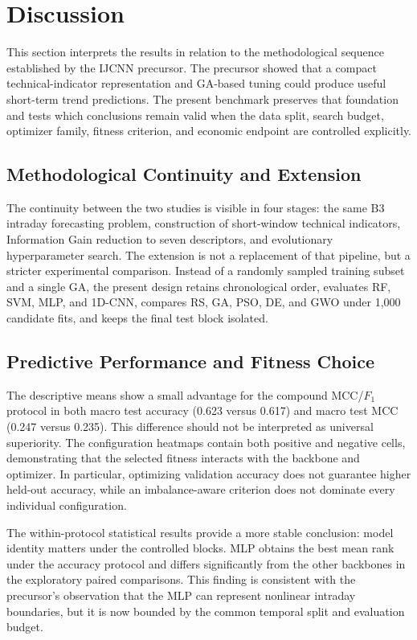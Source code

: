 \section{Discussion}\label{sec:discussion}

This section interprets the results in relation to the methodological sequence established by the IJCNN precursor. The precursor showed that a compact technical-indicator representation and GA-based tuning could produce useful short-term trend predictions. The present benchmark preserves that foundation and tests which conclusions remain valid when the data split, search budget, optimizer family, fitness criterion, and economic endpoint are controlled explicitly.

\subsection{Methodological Continuity and Extension}

The continuity between the two studies is visible in four stages: the same B3 intraday forecasting problem, construction of short-window technical indicators, Information Gain reduction to seven descriptors, and evolutionary hyperparameter search. The extension is not a replacement of that pipeline, but a stricter experimental comparison. Instead of a randomly sampled training subset and a single GA, the present design retains chronological order, evaluates RF, SVM, MLP, and 1D-CNN, compares RS, GA, PSO, DE, and GWO under 1,000 candidate fits, and keeps the final test block isolated.

\subsection{Predictive Performance and Fitness Choice}

The descriptive means show a small advantage for the compound MCC/$F_1$ protocol in both macro test accuracy (0.623 versus 0.617) and macro test MCC (0.247 versus 0.235). This difference should not be interpreted as universal superiority. The configuration heatmaps contain both positive and negative cells, demonstrating that the selected fitness interacts with the backbone and optimizer. In particular, optimizing validation accuracy does not guarantee higher held-out accuracy, while an imbalance-aware criterion does not dominate every individual configuration.

The within-protocol statistical results provide a more stable conclusion: model identity matters under the controlled blocks. MLP obtains the best mean rank under the accuracy protocol and differs significantly from the other backbones in the exploratory paired comparisons. This finding is consistent with the precursor's observation that the MLP can represent nonlinear intraday boundaries, but it is now bounded by the common temporal split and evaluation budget.

